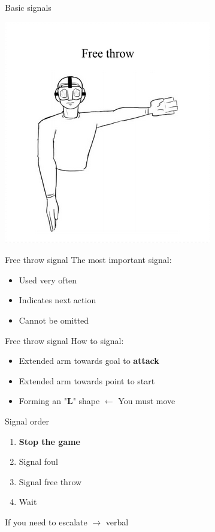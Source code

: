 \documentclass{beamer}
\begin{document}
    \begin{frame}{Basic signals}
        \begin{center}
            \includegraphics[scale=0.8]{freeThrowSignal}
        \end{center}
    \end{frame}

    \begin{frame}{Free throw signal}
        The most important signal:
        \begin{itemize}
            \item Used very often
            \item Indicates next action
            \item Cannot be omitted
        \end{itemize}
    \end{frame}

    \begin{frame}{Free throw signal}
        How to signal:
        \begin{itemize}
            \item Extended arm towards goal to \textbf{attack}
            \item Extended arm towards point to start

            \pause

            \item Forming an "\textbf{L}" shape \pause $\leftarrow$ You must move
        \end{itemize}
    \end{frame}

    \begin{frame}{Signal order}
        \begin{enumerate}
            \item \textbf{Stop the game}\pause
            \item Signal foul
            \item Signal free throw
            \item Wait
        \end{enumerate}

        \pause

        If you need to escalate $\rightarrow$ verbal
    \end{frame}
\end{document}
